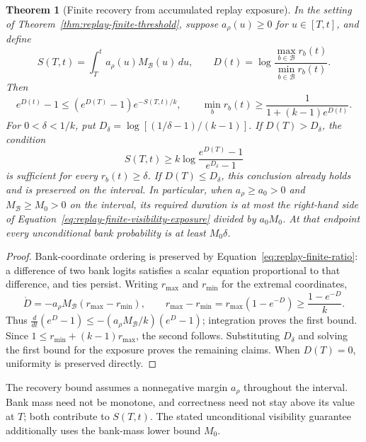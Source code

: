 \documentclass{article}
\newcommand{\enforcehalffinalproseline}{%
  \setlength{\parfillskip}{0pt plus .20\linewidth}}
\newcommand{\1}{\mathbf 1}
\newtheorem{theorem}[lemma]{Theorem}
\theoremstyle{remark}
\theoremstyle{definition}
\theoremstyle{plain}
\begin{document}
\begin{theorem}[Finite recovery from accumulated replay exposure]
\enforcehalffinalproseline
\label{thm:replay-finite-recovery}
In the setting of Theorem~\ref{thm:replay-finite-threshold}, suppose
$a_\rho(u)\ge0$ for $u\in[T,t]$, and define
\[
 S(T,t)=\int_T^t a_\rho(u)M_{\mathcal B}(u)\,du,
 \qquad D(t)=\log\frac{\max_{b\in\mathcal B}r_b(t)}
                            {\min_{b\in\mathcal B}r_b(t)}.
\]
Then
\begin{equation}
 e^{D(t)}-1\le(e^{D(T)}-1)e^{-S(T,t)/k},
 \qquad
 \min_b r_b(t)\ge\frac{1}{1+(k-1)e^{D(t)}}.
 \label{eq:replay-finite-recovery}
\end{equation}
For $0<\delta<1/k$, put
$D_\delta=\log[(1/\delta-1)/(k-1)]$. If $D(T)>D_\delta$, the condition
\begin{equation}
 S(T,t)\ge k\log\frac{e^{D(T)}-1}{e^{D_\delta}-1}
 \label{eq:replay-finite-visibility-exposure}
\end{equation}
is sufficient for every $r_b(t)\ge\delta$. If $D(T)\le D_\delta$, this
conclusion already holds and is preserved on the interval. In particular,
when $a_\rho\ge a_0>0$ and $M_{\mathcal B}\ge M_0>0$ on the interval,
its required duration is at most the right-hand side of
Equation~\eqref{eq:replay-finite-visibility-exposure} divided by $a_0M_0$.
At that endpoint every unconditional bank probability is at least
$M_0\delta$.
\end{theorem}

\begin{proof}
\enforcehalffinalproseline
Bank-coordinate ordering is preserved by
Equation~\eqref{eq:replay-finite-ratio}: a difference of two bank logits
satisfies a scalar equation proportional to that difference, and ties persist.
Writing $r_{\max}$ and $r_{\min}$ for the extremal coordinates,
\[
 \dot D=-a_\rho M_{\mathcal B}(r_{\max}-r_{\min}),
 \qquad
 r_{\max}-r_{\min}
   =r_{\max}(1-e^{-D})\ge\frac{1-e^{-D}}{k}.
\]
Thus $\frac{d}{dt}(e^D-1)\le
 -(a_\rho M_{\mathcal B}/k)(e^D-1)$; integration proves the first bound.
Since $1\le r_{\min}+(k-1)r_{\max}$, the second follows. Substituting
$D_\delta$ and solving the first bound for the exposure proves the remaining
claims. When $D(T)=0$, uniformity is preserved directly.
\end{proof}

The recovery bound assumes a nonnegative margin $a_\rho$ throughout
the interval. Bank mass need not be monotone, and correctness need not stay
above its value at $T$; both contribute to $S(T,t)$. The stated unconditional
visibility guarantee additionally uses the bank-mass lower bound $M_0$.
\end{document}
